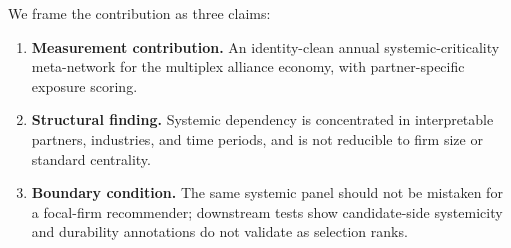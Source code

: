 \documentclass[11pt,letterpaper]{article}
\begin{document}
We frame the contribution as three claims:
\begin{enumerate}
  \item \textbf{Measurement contribution.} An identity-clean annual
  systemic-criticality meta-network for the multiplex alliance
  economy, with partner-specific exposure scoring.
  \item \textbf{Structural finding.} Systemic dependency is
  concentrated in interpretable partners, industries, and time
  periods, and is not reducible to firm size or standard centrality.
  \item \textbf{Boundary condition.} The same systemic panel should
  not be mistaken for a focal-firm recommender; downstream tests
  show candidate-side systemicity and durability annotations do not
  validate as selection ranks.
\end{enumerate}
\end{document}
